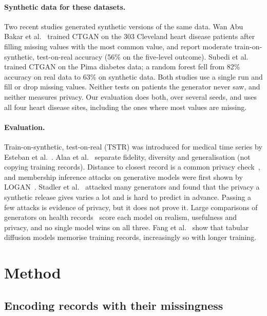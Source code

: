 \documentclass[runningheads]{llncs}
\begin{document}
\paragraph{Synthetic data for these datasets.}
Two recent studies generated synthetic versions of the same data.
Wan Abu Bakar et al.~\cite{wanabubakar2025ctgan} trained CTGAN on the 303
Cleveland heart disease patients after filling missing values with the most
common value, and report moderate train-on-synthetic, test-on-real accuracy
(56\% on the five-level outcome). Subedi et al.~\cite{subedi2025health}
trained CTGAN on the Pima diabetes data; a random forest fell from 82\%
accuracy on real data to 63\% on synthetic data. Both studies use a single
run and fill or drop missing values. Neither tests on patients the generator never saw, and neither
measures privacy. Our evaluation does both, over several seeds, and uses
all four heart disease sites, including the ones where most values are
missing.

\paragraph{Evaluation.}
Train-on-synthetic, test-on-real (TSTR) was introduced for medical time
series by Esteban et al.~\cite{esteban2017rcgan}. Alaa et
al.~\cite{alaa2022faithful} separate fidelity, diversity and generalisation
(not copying training records). Distance to closest record is a common
privacy check~\cite{zhao2021ctabgan}, and membership inference attacks on
generative models were first shown by LOGAN~\cite{hayes2019logan}. Stadler et
al.~\cite{stadler2022groundhog} attacked many generators and found that
the privacy a synthetic release gives varies a lot and is hard to predict in
advance. Passing a few attacks is evidence of privacy, but it does not prove
it. Large comparisons of generators on health
records~\cite{goncalves2020synthetic,yan2022benchmark} score each model on
realism, usefulness and privacy, and no single model wins on all three. Fang et
al.~\cite{fang2025memorization} show that tabular diffusion models memorise
training records, increasingly so with longer training.

\section{Method}

\subsection{Encoding records with their missingness}
\label{sec:encoding}
\end{document}
